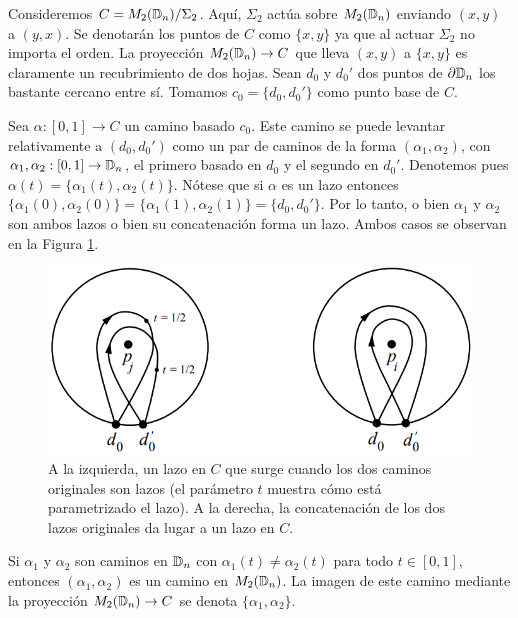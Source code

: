 \documentclass[TFG.tex]{subfiles}
\begin{document}
Consideremos $C=M_2(\mathbb{D}_n)/\Sigma_2$. Aquí, $\Sigma_2$ actúa sobre $M_2(\mathbb{D}_n)$ enviando $(x,y)$ a $(y,x)$. Se denotarán los puntos de $C$ como $\{x,y\}$ ya que al actuar $\Sigma_2$ no importa el orden. La proyección $M_2(\mathbb{D}_n)\to C$ que lleva $(x,y)$ a $\{x,y\}$ es claramente un recubrimiento de dos hojas. Sean $d_0$ y $d_0'$ dos puntos de $\partial\mathbb{D}_n$ los bastante cercano entre sí. Tomamos $c_0=\{d_0,d_0'\}$ como punto base de $C$.


Sea $\alpha:[0,1]\to C$ un camino basado $c_0$. Este camino se puede levantar relativamente a $(d_0,d_0')$ como un par de caminos de la forma $(\alpha_1,\alpha_2)$, con$ \alpha_1,\alpha_2:[0,1]\to\mathbb{D}_n$, el primero basado en $d_0$ y el segundo en $d_0'$. Denotemos pues $\alpha(t)=\{\alpha_1(t),\alpha_2(t)\}$. Nótese que si $\alpha$ es un lazo entonces $\{\alpha_1(0),\alpha_2(0)\}=\{\alpha_1(1),\alpha_2(1)\}=\{d_0,d_0'\}$. Por lo tanto, o bien $\alpha_1$ y $\alpha_2$ son ambos lazos o bien su concatenación forma un lazo. Ambos casos se observan en la Figura \ref{loop}. 

\begin{figure}[h!]
\includegraphics[scale=0.6]{Imagenes/loop}
\caption{A la izquierda, un lazo en $C$ que surge cuando los dos caminos originales son lazos (el parámetro $t$ muestra cómo está parametrizado el lazo). A la derecha, la concatenación de los dos lazos originales da lugar a un lazo en $C$.}\label{loop}
\end{figure}


Si $\alpha_1$ y $\alpha_2$ son caminos en $\mathbb{D}_n$ con $\alpha_1(t)\neq\alpha_2(t)$ para todo $t\in[0,1]$, entonces $(\alpha_1,\alpha_2)$ es un camino en $M_2(\mathbb{D}_n)$. La imagen de este camino mediante la proyección $M_2(\mathbb{D}_n)\to C$ se denota $\{\alpha_1,\alpha_2\}$.
\end{document}
